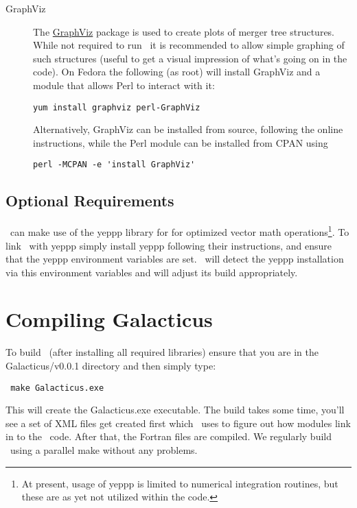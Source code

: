 \begin{description}
\item[GraphViz] The \href{http://www.graphviz.org/}{GraphViz} package is used to create plots of merger tree structures. While not required to run \glc\ it is recommended to allow simple graphing of such structures (useful to get a visual impression of what's going on in the code). On Fedora the following (as root) will install GraphViz and a module that allows Perl to interact with it:
\begin{verbatim}
yum install graphviz perl-GraphViz
\end{verbatim}
Alternatively, GraphViz can be installed from source, following the online instructions, while the Perl module can be installed from CPAN using
\begin{verbatim}
perl -MCPAN -e 'install GraphViz'
\end{verbatim}

\end{description}

\subsection{Optional Requirements}

\glc\ can make use of the \gls{yeppp} library for for optimized vector math operations\footnote{At present, usage of \proect\gls{yeppp} is limited to numerical integration routines, but these are as yet not utilized within the code.}. To link \glc\ with \gls{yeppp} simply install \gls{yeppp} following their instructions, and ensure that the \gls{yeppp} environment variables are set. \glc\ will detect the \gls{yeppp} installation via this environment variables and will adjust its build appropriately.

\section{Compiling Galacticus}

To build \glc\ (after installing all required libraries) ensure that you are in the {\normalfont \ttfamily Galacticus/v0.0.1} directory and then simply type:
\begin{verbatim}
 make Galacticus.exe
\end{verbatim}
This will create the {\normalfont \ttfamily Galacticus.exe} executable. The build takes some time, you'll see a set of XML files get created first which \glc\ uses to figure out how modules link in to the \glc\ code. After that, the Fortran files are compiled. We regularly build \glc\ using a parallel make without any problems.

